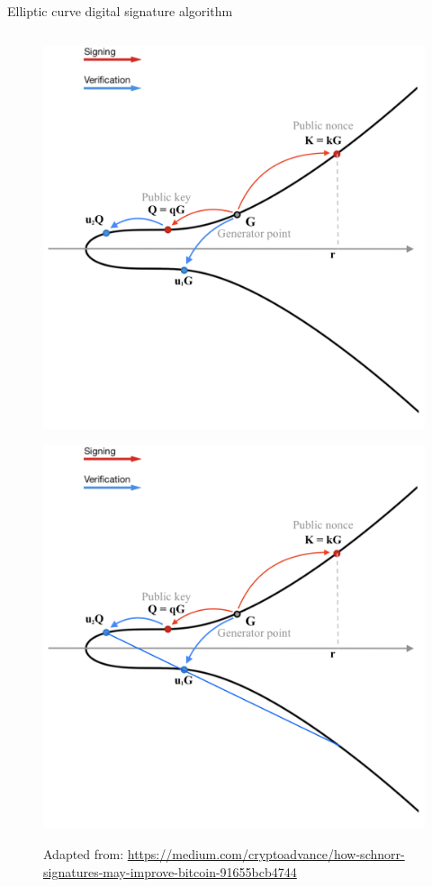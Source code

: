 \documentclass[slidescentered]{beamer}
\newcommand{\source}[1]{\caption*{\tiny Adapted from: {#1}} }
\begin{document}
\begin{frame}{Elliptic curve digital signature algorithm}
\begin{columns}
\begin{column}{0.5\linewidth}
\begin{figure}
					 {\vspace*{-0.7cm}
						\hspace*{-1.7cm}
						\includegraphics[scale=0.29]{images/ECDSA5}
						\source{\tiny \url{https://medium.com/cryptoadvance/how-schnorr-signatures-may-improve-bitcoin-91655bcb4744}}}
					 {\vspace*{-0.7cm}
						\hspace*{-1.7cm}
						\includegraphics[scale=0.29]{images/ECDSA6}
}
\end{figure}
\end{column}
\end{columns}
\end{frame}
\end{document}
